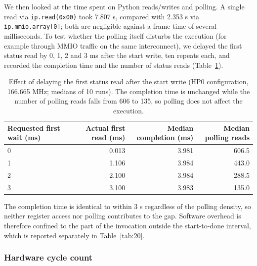 We then looked at the time spent on Python reads/writes and polling. A single read via \texttt{ip.read(0x00)} took 7.807 \textmu{}s, compared with 2.353 \textmu{}s via \texttt{ip.mmio.array[0]}; both are negligible against a frame time of several milliseconds. To test whether the polling itself disturbs the execution (for example through MMIO traffic on the same interconnect), we delayed the first status read by 0, 1, 2 and 3 ms after the start write, ten repeats each, and recorded the completion time and the number of status reads (Table~\ref{tab:16}).

\begin{table}[!htbp]
\centering
\footnotesize
\caption{Effect of delaying the first status read after the start write (HP0 configuration, 166.665 MHz; medians of 10 runs). The completion time is unchanged while the number of polling reads falls from 606 to 135, so polling does not affect the execution.}
\label{tab:16}
\begin{tabular}{lrrr}
\toprule
Requested first wait (ms) & Actual first read (ms) & Median completion (ms) & Median polling reads \\
\midrule
0 & 0.013 & 3.981 & 606.5 \\
1 & 1.106 & 3.984 & 443.0 \\
2 & 2.100 & 3.984 & 288.5 \\
3 & 3.100 & 3.983 & 135.0 \\
\bottomrule
\end{tabular}
\end{table}

The completion time is identical to within 3 \textmu{}s regardless of the polling density, so neither register access nor polling contributes to the gap. Software overhead is therefore confined to the part of the invocation outside the start-to-done interval, which is reported separately in Table~\ref{tab:20}.

\subsubsection{Hardware cycle count}\label{sec:5.3.3}


